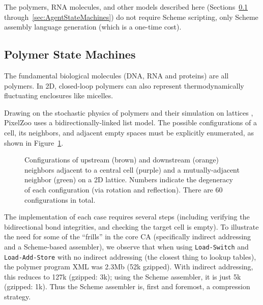 \documentclass{acm_proc_article-sp}
\begin{document}
The polymers, RNA molecules, and other models described here
 (Sections~\ref{sec:PolymerStateMachines} through~\ref{sec:AgentStateMachines})
 do not require Scheme scripting, only Scheme assembly language generation (which is a one-time cost).

\subsection{Polymer State Machines}
\label{sec:PolymerStateMachines}

The fundamental biological molecules (DNA, RNA and proteins) are all polymers.
In 2D, closed-loop polymers can also represent thermodynamically fluctuating enclosures like micelles.

Drawing on the stochastic physics of polymers \cite{DoiEdwards1988}
and their simulation on lattices \cite{PhysRevLett.64.1915,journals/pc/OstrovskyCSB01},
PixelZoo uses a bidirectionally-linked list model.
The possible configurations of a cell, its neighbors, and adjacent empty spaces must
be explicitly enumerated, as shown in Figure~\ref{fig:polymer}.

\begin{figure}
\caption{
\label{fig:polymer}
Configurations of upstream (brown) and downstream (orange) neighbors adjacent to a central cell (purple) and a mutually-adjacent neighbor (green) on a 2D lattice.
Numbers indicate the degeneracy of each configuration (via rotation and reflection).
There are 60 configurations in total.
}
\end{figure}

The implementation of each case requires several steps (including verifying the bidirectional bond integrities,
and checking the target cell is empty).
To illustrate the need for some of the ``frills'' in the core CA
(specifically indirect addressing and a Scheme-based assembler),
we observe that when using {\tt Load-Switch} and {\tt Load-Add-Store}
with no indirect addressing (the closest thing to lookup tables), the polymer program XML was 2.3Mb (52k gzipped).
With indirect addressing, this reduces to 127k (gzipped: 3k);
using the Scheme assembler, it is just 5k (gzipped: 1k).
Thus the Scheme assembler is, first and foremost, a compression strategy.
\end{document}
